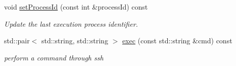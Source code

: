 \begin{DoxyCompactItemize}
void \hyperlink{classSSHExec_ac1c7e79f74476408ee267540b1c96771}{setProcessId} (const int \&processId) const 
\begin{DoxyCompactList}\small\item\em Update the last execution process identifier. \item\end{DoxyCompactList}\item 
std::pair$<$ std::string, std::string $>$ \hyperlink{classSSHExec_adb964e0054f177d1c158106c161f904b}{exec} (const std::string \&cmd) const 
\begin{DoxyCompactList}\small\item\em perform a command through ssh \item\end{DoxyCompactList}\end{DoxyCompactItemize}
